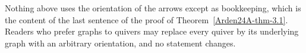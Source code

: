 \begin{remark}\label{Arden24A-rem-4.1}
\label{Arden24A-rem:orientation}
Nothing above uses the orientation of the arrows except as bookkeeping, which is the content of the last sentence of the proof of Theorem~\ref{Arden24A-thm-3.1}. Readers who prefer graphs to quivers may replace every quiver by its underlying graph with an arbitrary orientation, and no statement changes.
\end{remark}